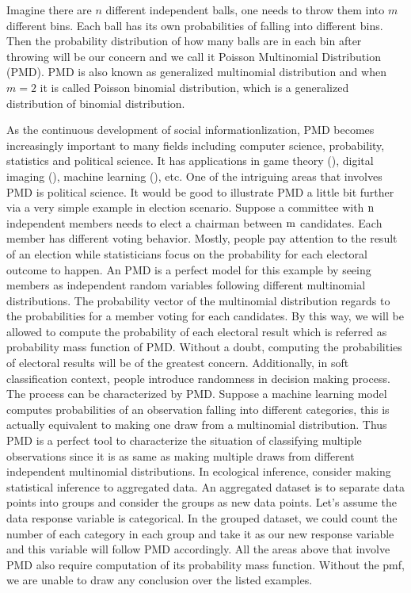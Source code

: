 \documentclass[12pt]{article}
\newcommand{\PMD}{\textrm{PMD}}
\begin{document}
Imagine there are $n$ different independent balls, one needs to throw them into $m$ different bins. Each ball has its own probabilities of falling into different bins. Then the probability distribution of how many balls are in each bin after throwing will be our concern and we call it Poisson Multinomial Distribution (\PMD). $\PMD$ is also known as generalized multinomial distribution and when $m=2$ it is called Poisson binomial distribution, which is a generalized distribution of binomial distribution. 

As the continuous development of social informationlization, $\PMD$ becomes increasingly important to many fields including computer science, probability, statistics and political science. It has applications in game theory (), digital imaging (), machine learning (), etc. One of the intriguing areas that involves $\PMD$ is political science. It would be good to illustrate $\PMD$ a little bit further via a very simple example in election scenario. Suppose a committee with $\rm n$  independent members needs to elect a chairman between $\rm m$ candidates. Each member has different voting behavior. Mostly, people pay attention to the result of an election while statisticians focus on the probability for each electoral outcome to happen. An $\PMD$ is a perfect model for this example by seeing members as independent random variables following different multinomial distributions. The probability vector of the multinomial distribution regards to the probabilities for a member voting for each candidates. By this way, we will be allowed to compute the probability of each electoral result which is referred as probability mass function of $\PMD$. Without a doubt, computing the probabilities of electoral results will be of the greatest concern. Additionally, in soft classification context, people introduce randomness in decision making process. The process can be characterized by $\PMD$. Suppose 
a machine learning model computes probabilities of an observation falling into different categories, this is actually equivalent to making one draw from a multinomial distribution. Thus $\PMD$ is a perfect tool to characterize the situation of  classifying multiple observations since it is as same as making multiple draws from different independent multinomial distributions. In ecological inference, consider making statistical inference to aggregated data. An aggregated dataset is to separate data points into groups and consider the groups as new data points. Let's assume the data response variable is categorical. In the grouped dataset, we could count the number of each category in each group and take it as our new response variable and this variable will follow $\PMD$ accordingly. All the areas above that involve $\PMD$ also require computation of its probability mass function. Without the pmf, we are unable to draw any conclusion over the listed examples.
\end{document}
